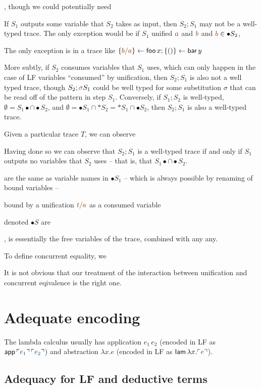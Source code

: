, though we could
potentially need

If $S_1$
outputs some variable that $S_2$ takes as input, then $S_2; S_1$ may
not be a well-typed trace. The only exception would be if $S_1$
unified $\lf{a}$ and $\lf{b}$ and $\lf{b} \in {\bullet}S_2$, 

The only exception
is in a trace like $\trstep{\lf{b/a}}{\sf foo}\,x; \trstep{()}{\sf bar}\,y$


 More subtly, if
$S_2$ consumes variables that $S_1$ uses, which can only happen in the
case of LF variables ``consumed'' by unification, then $S_2; S_1$ is
also not a well typed trace, though $S_2; \lf{\sigma}S_1$ could be
well typed for some substitution $\sigma$ that can be read off of the
pattern in step $S_1$. Conversely, if $S_1; S_2$ is well-typed,
$\emptyset = S_1{\bullet} \cap {\bullet}S_2$, and $\emptyset =
{\bullet}S_1 \cap {\ast}S_2 = {\ast}S_1 \cap {\bullet}S_2$, then $S_2;
S_1$ is also a well-typed trace.

Given a particular trace $T$, we can observe 

Having done so we can observe that $S_2; S_1$ is a
well-typed trace if and only if $S_1$ outputs no variables
that $S_2$ uses -- that is, that $S_1{\bullet} \cap {\bullet}S_2$.

are the same as variable
names in ${\bullet}S_1$ -- which is always possible by renaming of
bound variables --

bound by
a unification $\lf{t/a}$ as a consumed variable


 denoted ${\bullet}S$
are 

, is 
essentially the free variables of the trace, combined with any any. 


To define concurrent equality, we 

It is not obvious that our treatment of the interaction between 
unification and concurrent eqivalence is the right one. 

\section{Adequate encoding}

The lambda
calculus usually has application $e_1\,e_2$ (encoded in LF as ${\sf
  app}\,\interp{e_1}\,\interp{e_2}$) and abstraction $\lambda x.e$
(encoded in LF as ${\sf lam}\,\lambda x. \interp{e}$). 

\subsection{Adequacy for LF and deductive terms}


